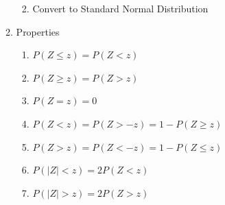 \documentclass{report}
\begin{document}
\begin{multicols}{2}
\begin{enumerate}
\begin{enumerate}
\begin{enumerate}
\begin{center}
                          \end{center}
                    \item Convert to Standard Normal Distribution
                          \begin{cequation}
                          \end{cequation}
                  \end{enumerate}
            \item Properties
                  \begin{enumerate}
                    \item $P(Z \leq z) = P(Z < z)$
                    \item $P(Z \geq z) = P(Z > z)$
                    \item $P(Z = z) = 0$
                    \item $P(Z < z) = P(Z > -z) = 1 - P(Z \geq z)$
                    \item $P(Z > z) = P(Z < -z) = 1 - P(Z \leq z)$
                    \item $P(|Z| < z) = 2P(Z < z)$
                    \item $P(|Z| > z) = 2P(Z > z)$
                  \end{enumerate}
          \end{enumerate}
  \end{enumerate}
\end{multicols}
\end{document}
